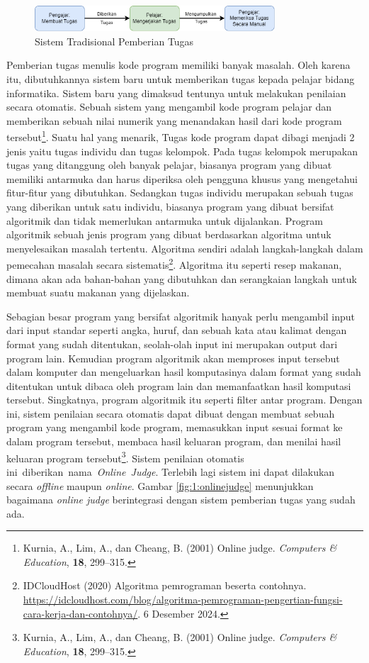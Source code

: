 \documentclass[a4paper,twoside]{article}
\begin{document}
\begin{figure}[H]
	\centering
	\includegraphics[width=0.8\textwidth]{tradisional.drawio.png}
	\caption[Sistem Tradisional Pemberian Tugas]{Sistem Tradisional Pemberian Tugas}
	\label{fig:1:tradisional}
\end{figure}

Pemberian tugas menulis kode program memiliki banyak masalah. Oleh karena itu, dibutuhkannya sistem baru untuk memberikan tugas kepada pelajar bidang informatika. Sistem baru yang dimaksud tentunya untuk melakukan penilaian secara otomatis. Sebuah sistem yang mengambil kode program pelajar dan memberikan sebuah nilai numerik yang menandakan hasil dari kode program tersebut\footnote{Kurnia, A., Lim, A., dan Cheang, B. (2001) Online judge. {\em Computers \& Education}, {\bf  18}, 299--315.}. Suatu hal yang menarik, Tugas kode program dapat dibagi menjadi 2 jenis yaitu tugas individu dan tugas kelompok. Pada tugas kelompok merupakan tugas yang ditanggung oleh banyak pelajar, biasanya program yang dibuat memiliki antarmuka dan harus diperiksa oleh pengguna khusus yang mengetahui fitur-fitur yang dibutuhkan. Sedangkan tugas individu merupakan sebuah tugas yang diberikan untuk satu individu, biasanya program yang dibuat bersifat algoritmik dan tidak memerlukan antarmuka untuk dijalankan. Program algoritmik sebuah jenis program yang dibuat berdasarkan algoritma untuk menyelesaikan masalah tertentu. Algoritma sendiri adalah langkah-langkah dalam pemecahan masalah secara sistematis\footnote{IDCloudHost (2020) Algoritma pemrograman beserta contohnya.
	\newblock \url{https://idcloudhost.com/blog/algoritma-pemrograman-pengertian-fungsi-cara-kerja-dan-contohnya/}.
	6 Desember 2024.}.
Algoritma itu seperti resep makanan, dimana akan ada bahan-bahan yang dibutuhkan dan serangkaian langkah untuk membuat suatu makanan yang dijelaskan.

Sebagian besar program yang bersifat algoritmik hanyak perlu mengambil input dari input standar seperti angka, huruf, dan sebuah kata atau kalimat dengan format yang sudah ditentukan, seolah-olah input ini merupakan output dari program lain. Kemudian program algoritmik akan memproses input tersebut dalam komputer dan mengeluarkan hasil komputasinya dalam format yang sudah ditentukan untuk dibaca oleh program lain dan memanfaatkan hasil komputasi tersebut. Singkatnya, program algoritmik itu seperti filter antar program. Dengan ini, sistem penilaian secara otomatis dapat dibuat dengan membuat sebuah program yang mengambil kode program, memasukkan input sesuai format ke dalam program tersebut, membaca hasil keluaran program, dan menilai hasil keluaran program tersebut\footnote{Kurnia, A., Lim, A., dan Cheang, B. (2001) Online judge. {\em Computers \& Education}, {\bf  18}, 299--315.}. Sistem penilaian otomatis \mbox{ini diberikan nama \textit{Online Judge}}. Terlebih lagi sistem ini dapat dilakukan secara \textit{offline} maupun \textit{online}. Gambar \ref{fig:1:onlinejudge} menunjukkan bagaimana \textit{online judge} berintegrasi dengan sistem pemberian tugas yang sudah ada.
\end{document}
